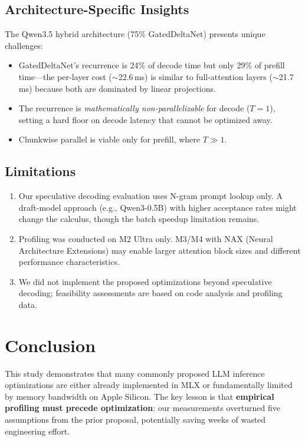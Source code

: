\documentclass[11pt,a4paper]{article}
\begin{document}
\subsection{Architecture-Specific Insights}

The Qwen3.5 hybrid architecture (75\% GatedDeltaNet) presents unique challenges:
\begin{itemize}[leftmargin=2em]
  \item GatedDeltaNet's recurrence is 24\% of decode time but only 29\% of prefill time---the per-layer cost ($\sim$22.6\,ms) is similar to full-attention layers ($\sim$21.7\,ms) because both are dominated by linear projections.
  \item The recurrence is \emph{mathematically non-parallelizable} for decode ($T=1$), setting a hard floor on decode latency that cannot be optimized away.
  \item Chunkwise parallel is viable only for prefill, where $T \gg 1$.
\end{itemize}

\subsection{Limitations}

\begin{enumerate}[leftmargin=2em]
  \item Our speculative decoding evaluation uses N-gram prompt lookup only. A draft-model approach (e.g., Qwen3-0.5B) with higher acceptance rates might change the calculus, though the batch speedup limitation remains.
  \item Profiling was conducted on M2 Ultra only. M3/M4 with NAX (Neural Architecture Extensions) may enable larger attention block sizes and different performance characteristics.
  \item We did not implement the proposed optimizations beyond speculative decoding; feasibility assessments are based on code analysis and profiling data.
\end{enumerate}

\section{Conclusion}

This study demonstrates that many commonly proposed LLM inference optimizations are either already implemented in MLX or fundamentally limited by memory bandwidth on Apple Silicon. The key lesson is that \textbf{empirical profiling must precede optimization}: our measurements overturned five assumptions from the prior proposal, potentially saving weeks of wasted engineering effort.
\end{document}
